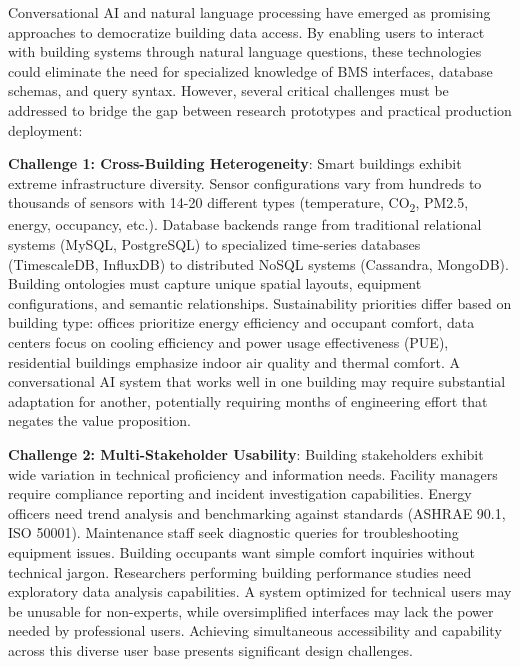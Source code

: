 \documentclass[acmlarge]{acmart}
\begin{document}
Conversational AI and natural language processing have emerged as promising approaches to democratize building data access. By enabling users to interact with building systems through natural language questions, these technologies could eliminate the need for specialized knowledge of BMS interfaces, database schemas, and query syntax. However, several critical challenges must be addressed to bridge the gap between research prototypes and practical production deployment:

\textbf{Challenge 1: Cross-Building Heterogeneity}: Smart buildings exhibit extreme infrastructure diversity. Sensor configurations vary from hundreds to thousands of sensors with 14-20 different types (temperature, CO\textsubscript{2}, PM2.5, energy, occupancy, etc.). Database backends range from traditional relational systems (MySQL, PostgreSQL) to specialized time-series databases (TimescaleDB, InfluxDB) to distributed NoSQL systems (Cassandra, MongoDB). Building ontologies must capture unique spatial layouts, equipment configurations, and semantic relationships. Sustainability priorities differ based on building type: offices prioritize energy efficiency and occupant comfort, data centers focus on cooling efficiency and power usage effectiveness (PUE), residential buildings emphasize indoor air quality and thermal comfort. A conversational AI system that works well in one building may require substantial adaptation for another, potentially requiring months of engineering effort that negates the value proposition.

\textbf{Challenge 2: Multi-Stakeholder Usability}: Building stakeholders exhibit wide variation in technical proficiency and information needs. Facility managers require compliance reporting and incident investigation capabilities. Energy officers need trend analysis and benchmarking against standards (ASHRAE 90.1, ISO 50001). Maintenance staff seek diagnostic queries for troubleshooting equipment issues. Building occupants want simple comfort inquiries without technical jargon. Researchers performing building performance studies need exploratory data analysis capabilities. A system optimized for technical users may be unusable for non-experts, while oversimplified interfaces may lack the power needed by professional users. Achieving simultaneous accessibility and capability across this diverse user base presents significant design challenges.
\end{document}
